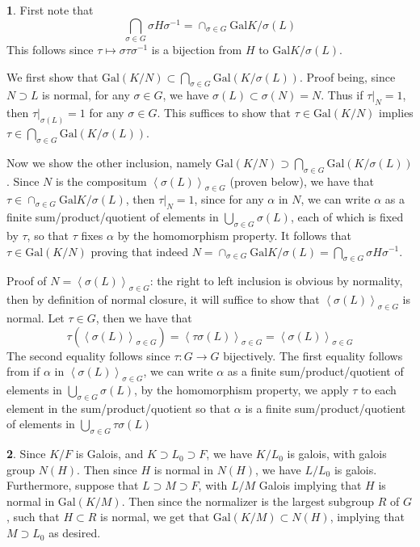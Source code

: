 \documentclass[11pt]{article}
\theoremstyle{definition}
\newtheorem{pb}{}
\newcommand{\gen}[1]{\left\langle #1 \right\rangle}
\newcommand{\gal}{\text{Gal}}
\begin{document}
    \begin{pb}
        First note that
        \[\bigcap_{\sigma \in G}\sigma H \sigma^{-1} = \cap_{\sigma \in G}\gal{K/\sigma(L)}\]
        This follows since \(\tau \mapsto \sigma\tau\sigma^{-1}\) is a bijection from \(H\) to \(\gal{K/\sigma(L)}\).

        We first show that \(\gal(K/N) \subset \bigcap_{\sigma \in G}\gal(K/\sigma(L))\). Proof being, since \(N \supset L\) is normal, for any \(\sigma \in G\), we have 
        \(\sigma(L) \subset \sigma(N) = N\). Thus if \(\tau\vert_N = 1\), then \(\tau\vert_{\sigma(L)} = 1\) for any \(\sigma \in G\). This suffices to show that
        \(\tau \in \gal(K/N)\) implies \(\tau \in \bigcap_{\sigma \in G}\gal(K/\sigma(L))\).

        Now we show the other inclusion, namely \(\gal(K/N) \supset \bigcap_{\sigma \in G}\gal(K/\sigma(L))\). Since \(N\) is the compositum \(\gen{\sigma(L)}_{\sigma\in G}\)
        (proven below), we have that \(\tau \in \cap_{\sigma \in G}\gal{K/\sigma(L)}\), then \(\tau\vert_{N} = 1\), since for any \(\alpha\) in \(N\), we can write
        \(\alpha\) as a finite sum/product/quotient of elements in \(\bigcup_{\sigma\in G} \sigma(L)\), each of which is fixed by \(\tau\), so that \(\tau\) fixes \(\alpha\) by the
        homomorphism property. It follows that \(\tau \in \gal(K/N)\) proving that indeed \(N = \cap_{\sigma \in G}\gal{K/\sigma(L)} = \bigcap_{\sigma \in G}\sigma H \sigma^{-1}\).

        Proof of \(N = \gen{\sigma(L)}_{\sigma\in G}\): the right to left inclusion is obvious by normality, then by definition of normal closure, it will suffice to show that
        \(\gen{\sigma(L)}_{\sigma\in G}\) is normal. Let \(\tau \in G\), then we have that 
        \[\tau(\gen{\sigma(L)}_{\sigma\in G}) = \gen{\tau\sigma(L)}_{\sigma\in G} = \gen{\sigma(L)}_{\sigma\in G}\]
        The second equality follows since \(\tau: G \to G\) bijectively. The first equality follows from if \(\alpha\) in \(\gen{\sigma(L)}_{\sigma\in G}\), we can write
        \(\alpha\) as a finite sum/product/quotient of elements in \(\bigcup_{\sigma\in G} \sigma(L)\), by the homomorphism property, we apply \(\tau\) to each element in the
        sum/product/quotient so that \(\alpha\) is a finite sum/product/quotient of elements in \(\bigcup_{\sigma\in G} \tau\sigma(L)\)
    \end{pb}
    \begin{pb}
        Since \(K/F\) is Galois, and \(K \supset L_0 \supset F\), we have \(K/L_0\) is galois, with galois group \(N(H)\). Then since \(H\) is normal in \(N(H)\), we have
        \(L/L_0\) is galois. Furthermore, suppose that \(L \supset M \supset F\), with \(L/M\) Galois implying that \(H\) is normal in \(\gal(K/M)\). Then since the normalizer is the largest subgroup \(R\)
        of \(G\), such that \(H \subset R\) is normal, we get that \(\gal(K/M) \subset N(H)\), implying that \(M \supset L_0\) as desired.
    \end{pb}
\end{document}
